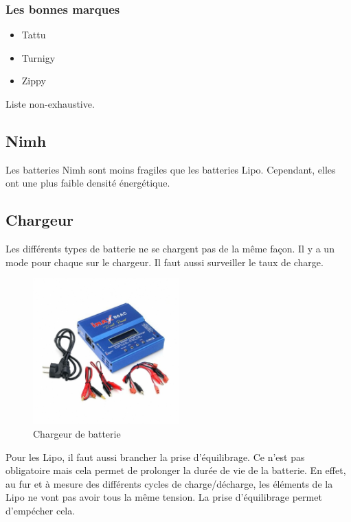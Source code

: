 \documentclass[a4paper, 11pt]{report}
\begin{document}
\subsubsection{Les bonnes marques}
\begin{itemize}
\item Tattu
\item Turnigy
\item Zippy
\end{itemize}
Liste non-exhaustive.

\subsection{Nimh}
Les batteries Nimh sont moins fragiles que les batteries Lipo. Cependant, elles ont une plus faible densité énergétique.

\subsection{Chargeur}
Les différents types de batterie ne se chargent pas de la même façon. Il y a un mode pour chaque sur le chargeur. Il faut aussi surveiller le taux de charge.

\begin{figure}[h!]
\begin{centering}
\includegraphics[width=0.5\textwidth]{images/chargeurBatterie.jpg}
\caption{Chargeur de batterie}
\par\end{centering}
\end{figure}

Pour les Lipo, il faut aussi brancher la prise d'équilibrage. Ce n'est pas obligatoire mais cela permet de prolonger la durée de vie de la batterie. En effet, au fur et à mesure des différents cycles de charge/décharge, les éléments de la Lipo ne vont pas avoir tous la même tension. La prise d'équilibrage permet d'empécher cela.
\end{document}
